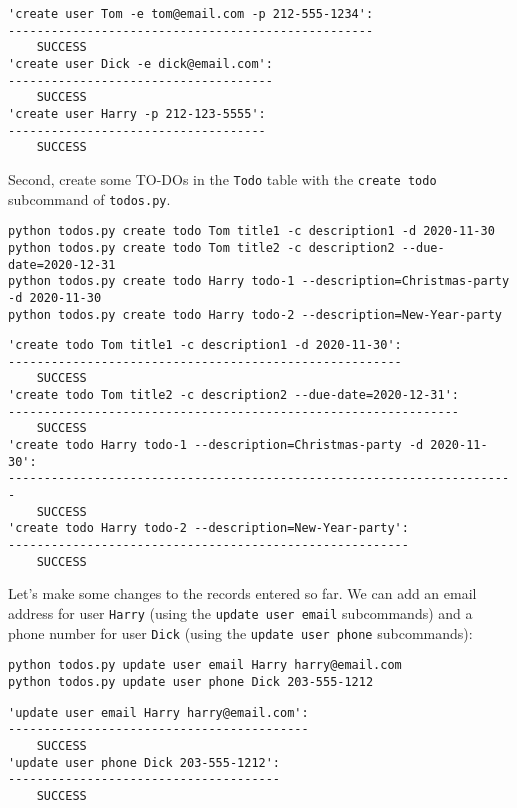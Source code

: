 \documentclass[10pt]{amsart}
\numberwithin{equation}{section}
\begin{document}
\begin{verbatim}
'create user Tom -e tom@email.com -p 212-555-1234':
---------------------------------------------------
	SUCCESS
'create user Dick -e dick@email.com':
-------------------------------------
	SUCCESS
'create user Harry -p 212-123-5555':
------------------------------------
	SUCCESS
\end{verbatim}


Second, create some TO-DOs in the \texttt{Todo} table with the \texttt{create todo} subcommand of \texttt{todos.py}. 
\begin{verbatim}
python todos.py create todo Tom title1 -c description1 -d 2020-11-30
python todos.py create todo Tom title2 -c description2 --due-date=2020-12-31
python todos.py create todo Harry todo-1 --description=Christmas-party -d 2020-11-30
python todos.py create todo Harry todo-2 --description=New-Year-party
\end{verbatim}

\begin{verbatim}
'create todo Tom title1 -c description1 -d 2020-11-30':
-------------------------------------------------------
	SUCCESS
'create todo Tom title2 -c description2 --due-date=2020-12-31':
---------------------------------------------------------------
	SUCCESS
'create todo Harry todo-1 --description=Christmas-party -d 2020-11-30':
-----------------------------------------------------------------------
	SUCCESS
'create todo Harry todo-2 --description=New-Year-party':
--------------------------------------------------------
	SUCCESS
\end{verbatim}

Let's make some changes to the records entered so far. We can add an email address
for user \texttt{Harry} (using the \texttt{update user email} subcommands) and a phone number for user \texttt{Dick} 
(using the \texttt{update user phone} subcommands):
\begin{verbatim}
python todos.py update user email Harry harry@email.com
python todos.py update user phone Dick 203-555-1212
\end{verbatim}

\begin{verbatim}
'update user email Harry harry@email.com':
------------------------------------------
	SUCCESS
'update user phone Dick 203-555-1212':
--------------------------------------
	SUCCESS
\end{verbatim}
\end{document}

